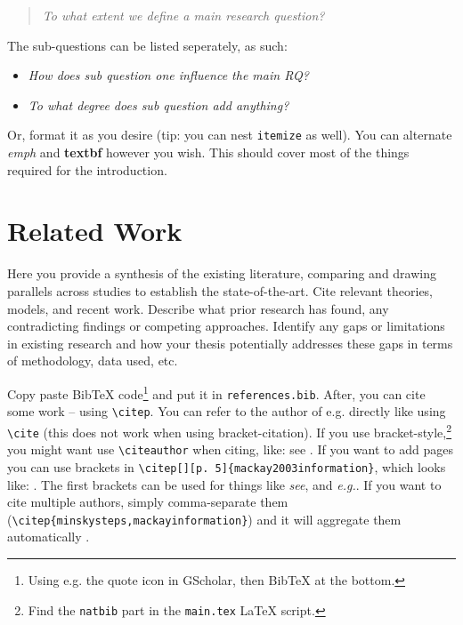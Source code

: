 \documentclass[11pt, a4paper]{article}
\begin{document}
\begin{quote}
\emph{To what extent we define a main research question?}
\end{quote}

\noindent The sub-questions can be listed seperately, as such:

\begin{itemize}
    \item[RQ1] \emph{How does sub question one influence the main RQ?}
    \item[RQ2] \emph{To what degree does sub question add anything?}
\end{itemize}

\noindent Or, format it as you desire (tip: you can nest \texttt{itemize} as well). You can alternate \emph{emph} and \textbf{textbf} however you wish. This should cover most of the things required for the introduction.

\section{Related Work}

Here you provide a synthesis of the existing literature, comparing and drawing parallels across studies to establish the state-of-the-art. Cite relevant theories, models, and recent work. Describe what prior research has found, any contradicting findings or competing approaches. Identify any gaps or limitations in existing research and how your thesis potentially addresses these gaps in terms of methodology, data used, etc.

Copy paste BibTeX code\footnote{Using e.g. the quote icon in GScholar, then BibTeX at the bottom.} and put it in \texttt{references.bib}. After, you can cite some work \citep{mackay2003information} -- using \texttt{\textbackslash citep}. You can refer to the author of e.g. \cite{minsky1961steps} directly like using \texttt{\textbackslash cite} (this does not work when using bracket-citation). If you use bracket-style,\footnote{Find the \texttt{natbib} part in the \texttt{main.tex} \LaTeX{} script.} you might want use \texttt{\textbackslash citeauthor} when citing, like: see \citeauthor{ananny2018seeing} \cite{ananny2018seeing}.  If you want to add pages you can use brackets in \texttt{\textbackslash citep[][p. 5]\{mackay2003information\}}, which looks like: \citep[][p. 5]{mackay2003information}. The first brackets can be used for things like \emph{see}, and \emph{e.g.}. If you want to cite multiple authors, simply comma-separate them (\texttt{\textbackslash citep\{\-minsky\-steps,\-mackay\-information\}}) and it will aggregate them automatically \citep{minsky1961steps,mackay2003information}.
\end{document}
